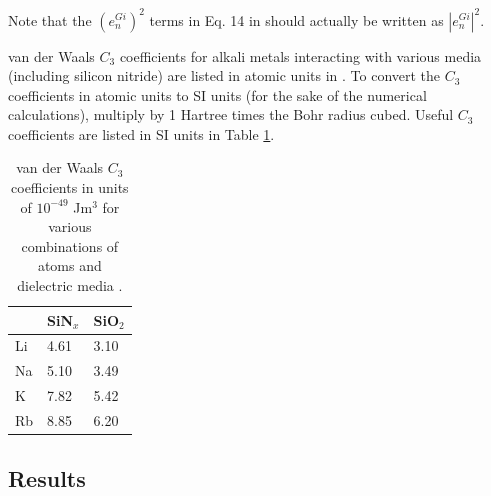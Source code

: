 \documentclass[twocolumn,pra,showpacs,superscriptaddress,longbibliography]{revtex4-1}   %
\begin{document}
Note that the $\left(e_n^{Gi}\right)^2$ terms in Eq. 14 in \cite{Cronin2005} should actually be written as $\left|e_n^{Gi}\right|^2$.

van der Waals $C_3$ coefficients for alkali metals interacting with various media (including silicon nitride) are listed in atomic units in \cite{Arora2014}. To convert the $C_3$ coefficients in atomic units to SI units (for the sake of the numerical calculations), multiply by 1 Hartree times the Bohr radius cubed. Useful $C_3$ coefficients are listed in SI units in Table \ref{tableC3}.

\begingroup
\begin{table}
\caption{\label{tableC3} van der Waals $C_3$ coefficients in units of $10^{-49}$ Jm$^3$ for various combinations of atoms and dielectric media \cite{Arora2014}.}
\begin{center}
\begin{tabular}{l|ll}
\hline\hline
& SiN$_x$ & SiO$_2$ \\
\hline
Li & 4.61 & 3.10 \\
Na & 5.10 & 3.49 \\
K &  7.82 & 5.42 \\
Rb & 8.85 & 6.20 \\
\hline\hline
\end{tabular}
\end{center}
\end{table}
\endgroup


\subsection{Results}
\end{document}
